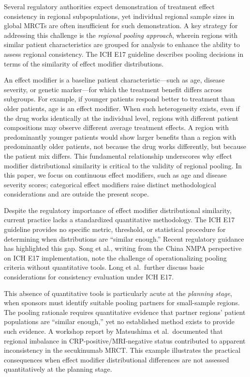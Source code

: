\documentclass[AMA,Times1COL]{WileyNJDv5}
\begin{document}
Several regulatory authorities expect demonstration of treatment effect consistency in regional subpopulations,\cite{matsushima2024,song2025} yet individual regional sample sizes in global MRCTs are often insufficient for such demonstration. A key strategy for addressing this challenge is the \emph{regional pooling approach}, wherein regions with similar patient characteristics are grouped for analysis to enhance the ability to assess regional consistency.\cite{iche17} The ICH E17 guideline describes pooling decisions in terms of the similarity of effect modifier distributions.\cite{iche17}

An effect modifier is a baseline patient characteristic---such as age, disease severity, or genetic marker---for which the treatment benefit differs across subgroups. For example, if younger patients respond better to treatment than older patients, age is an effect modifier. When such heterogeneity exists, even if the drug works identically at the individual level, regions with different patient compositions may observe different average treatment effects. A region with predominantly younger patients would show larger benefits than a region with predominantly older patients, not because the drug works differently, but because the patient mix differs. This fundamental relationship underscores why effect modifier distributional similarity is critical to the validity of regional pooling. In this paper, we focus on continuous effect modifiers, such as age and disease severity scores; categorical effect modifiers raise distinct methodological considerations and are outside the present scope.

Despite the regulatory importance of effect modifier distributional similarity, current practice lacks a standardized quantitative methodology. The ICH E17 guideline provides no specific metric, threshold, or statistical procedure for determining when distributions are ``similar enough.'' Recent regulatory guidance has highlighted this gap. Song et al., writing from the China NMPA perspective on ICH E17 implementation, note the challenge of operationalizing pooling criteria without quantitative tools.\cite{song2025} Long et al.\ further discuss basic considerations for consistency evaluation under ICH E17.\cite{long2025}

This absence of quantitative tools is particularly acute at the \emph{planning stage}, when sponsors must identify suitable pooling partners for small-sample regions. The pooling rationale requires quantitative evidence that partner regions' patient populations are ``similar enough,'' yet no established method exists to provide such evidence. A workshop report by Matsushima et al.\ documented that regional imbalance in CRP-positive/MRI-negative status contributed to apparent inconsistency in the secukinumab MRCT.\cite{matsushima2024} This example illustrates the practical consequences when effect modifier distributional differences are not assessed quantitatively at the planning stage.
\end{document}
